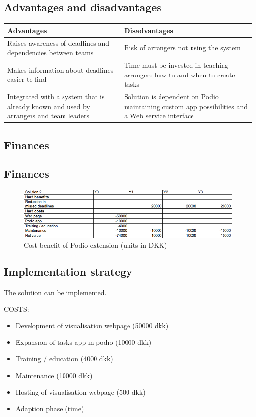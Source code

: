 \subsection{Advantages and disadvantages}
\label{sec:advantages_disadvantages}
\begin{center}
    \begin{tabular}{ | p{7cm} | p{7cm} |}
    \hline
    \textbf{Advantages} & \textbf{Disadvantages}  \\ \hline
     Raises awareness of deadlines and dependencies between teams & Risk of arrangers not using the system\\ \hline
     Makes information about deadlines easier to find & Time must be invested in teaching arrangers how to and when to create tasks\\ \hline
     Integrated with a system that is already known and used by arrangers and team leaders & Solution is dependent on Podio maintaining custom app possibilities and a Web service interface \\ \hline
    \hline
    \end{tabular}
\end{center}


\subsection{Finances}
\subsection{Finances}
\begin{figure}[h!]
  \centering
\includegraphics[scale=0.5]{Pictures/cost-benefit2.png}
    \caption{Cost benefit of Podio extension (units in DKK)}
\end{figure}

\subsection{Implementation strategy}
The solution can be implemented.




COSTS:
\begin{itemize}
    \item Development of visualisation webpage (50000 dkk)
    \item Expansion of tasks app in podio (10000 dkk)
    \item Training / education (4000 dkk)
    \item Maintenance (10000 dkk)
    \item Hosting of visualisation webpage (500 dkk)
    \item Adaption phase (time)
\end{itemize}

